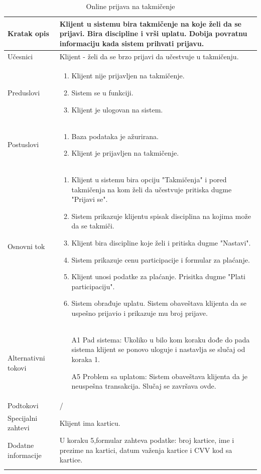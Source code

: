 \documentclass[../../main.tex]{subfiles}
\begin{document}
\begin{longtable}{| p{} | p{} |} 
\hline
    Kratak opis & Klijent u sistemu bira takmičenje na koje želi da se prijavi. Bira discipline i vrši uplatu. Dobija povratnu informaciju kada sistem prihvati prijavu. \\ 
\hline    
    Učesnici & Klijent - želi da se brzo prijavi da učestvuje u takmičenju.\\
\hline
   Preduslovi & \begin{enumerate}
       \item Klijent nije prijavljen na takmičenje.
       \item Sistem se u funkciji.
       \item Klijent je ulogovan na sistem.
   \end{enumerate}\\
\hline  
    Postuslovi & \begin{enumerate}
        \item Baza podataka je ažurirana.
        \item Klijent je prijavljen na takmičenje.
    \end{enumerate}\\
\hline
    Osnovni tok & \begin{enumerate}
        \item Klijent u sistemu bira opciju "Takmičenja"  i pored takmičenja na kom želi da učestvuje pritiska dugme "Prijavi se".
        \item Sistem prikazuje klijentu spisak disciplina na kojima može da se takmiči.
        \item Klijent bira discipline koje želi i pritiska dugme "Nastavi".
        \item Sistem prikazuje cenu participacije i formular za plaćanje.
        \item Klijent unosi podatke za plaćanje. Prisitka dugme "Plati participaciju".
        \item Sistem obrađuje uplatu. Sistem obaveštava klijenta da se uspešno prijavio i prikazuje mu broj prijave.
    \end{enumerate}\\
\hline
    Alternativni tokovi & \begin{itemize}
        \item[A1] Pad sistema: Ukoliko u bilo kom koraku dođe do pada sistema klijent se ponovo uloguje i nastavlja se slučaj od koraka 1.
        \item[A5] Problem sa uplatom: Sistem obaveštava klijenta da je neuspešna transakcija. Slučaj se završava ovde. 
    \end{itemize}\\
\hline
    Podtokovi & /\\
\hline
    Specijalni zahtevi & Klijent ima karticu.\\
\hline
    Dodatne informacije & U koraku 5,formular zahteva podatke: broj kartice, ime i prezime na kartici, datum važenja kartice i CVV kod sa kartice.\\
\hline
\caption{Online prijava na takmičenje} %
\end{longtable}
\end{document}
